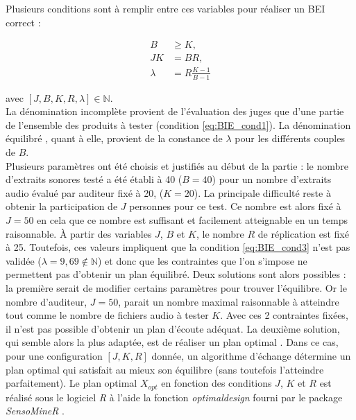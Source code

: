 Plusieurs conditions sont à remplir entre ces variables pour réaliser un BEI correct :

\begin{subequations}\label{BIE_cond}
\begin{align}
B &\geq K, \label{eq:BIE_cond1}\\
JK &= BR, \label{eq:BIE_cond2}\\
\lambda &= R\frac{K-1}{B-1} \label{eq:BIE_cond3}
\end{align}
\end{subequations}

avec $\left[J, B, K, R, \lambda\right] \in \mathbb{N}$.\\

La dénomination \og incomplète \fg{} provient de l'évaluation des juges que d'une partie de l'ensemble des produits à tester (condition \ref{eq:BIE_cond1}). La dénomination \og équilibré \fg{}, quant à elle, provient de la constance de $\lambda$ pour les différents couples de $B$. \\

Plusieurs paramètres ont été choisis et justifiés au début de la partie : le nombre d'extraits sonores testé a été établi à 40 ($B = 40$) pour un nombre d'extraits audio évalué par auditeur fixé à 20, ($K = 20$). La principale difficulté reste à obtenir la participation de $J$ personnes pour ce test. Ce nombre est alors fixé à $J = 50$ en cela que ce nombre est suffisant et facilement atteignable en un temps raisonnable. À partir des variables $J$, $B$ et $K$, le nombre $R$ de réplication est fixé à 25. Toutefois, ces valeurs impliquent que la condition \ref{eq:BIE_cond3} n'est pas validée ($\lambda = 9,69 \notin \mathbb{N}$) et donc que les contraintes que l'on s'impose ne permettent pas d'obtenir un plan équilibré. Deux solutions sont alors possibles : la première serait de modifier certains paramètres pour trouver l'équilibre. Or le nombre d'auditeur, $J = 50$, parait un nombre maximal raisonnable à atteindre tout comme le nombre de fichiers audio à tester $K$. Avec ces 2 contraintes fixées, il n'est pas possible d'obtenir un plan d'écoute adéquat. La deuxième solution, qui semble alors la plus adaptée, est de réaliser un plan optimal \cite{pages_blocs_2007}. Dans ce cas, pour une configuration $\left[J, K, R\right]$ donnée, un algorithme d'échange détermine un \og plan optimal \fg{} qui satisfait au mieux son équilibre (sans toutefois l'atteindre parfaitement). Le plan optimal $X_{opt}$ en fonction des conditions $J$, $K$ et $R$ est réalisé sous le logiciel \textit{R} à l'aide la fonction \textit{optimaldesign} fourni par le package \textit{SensoMineR} \cite{le_sensominer_2008}.


